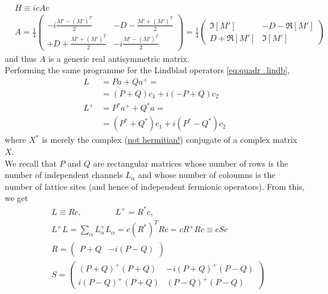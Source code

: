 \documentclass[a4paper,11pt]{article}
\theoremstyle{remark}
\newcommand{\ubar}[1]{\underline{#1}}
\begin{document}
    \begin{subequations}
    \label{eq:quadr_ham_majorana}
    \begin{align}
     & H \equiv icAc\\
     & A = \frac{1}{4}\left(
     \begin{array}{cc}
       -i\frac{M'-(M')^T}{2} & -D - \frac{M'+(M')^T}{2} \\
       + D + \frac{M'+(M')^T}{2} & -i \frac{M'-(M')^T}{2}
        \end{array}
        \right)
      =\frac{1}{4}\left( 
      \begin{array}{cc}
        \Im[M'] & -D-\Re[M']\\
        D+\Re[M'] & \Im[M']
        \end{array}
        \right)
    \end{align}
    \end{subequations}
    and thus $A$ is a generic real antisymmetric matrix.\\[0.3cm] Performing the same programme for the Lindblad operators \ref{eq:quadr_lindb},
    \begin{align*}
   L &= P a + Q a^+=\\
     &= (P+Q)c_1 +i(-P+Q)c_2\\
   L^+&= P^*a^++Q^*a=\\
     &= (P^*+Q^*)c_1+i(P^*-Q^*)c_2  
    \end{align*}  
   where $X^*$ is merely the complex (\ubar{not hermitian!}) conjugate of a complex matrix $X$. \\We recall that $P$ and $Q$ are rectangular matrices whose number of rows is the number of independent channels $L_{\alpha}$ and whose number of coloumns is the number of lattice sites (and hence of independent fermionic operators). From this, we get
  \begin{subequations}
  \label{eq:quadr_lindb_majorana}
  \begin{align}
      &L    \equiv Rc, \quad \quad \quad \quad  L^+  = R^*c,\\
      &L^+L = \sum_{\alpha} L^+_{\alpha}L^{ }_{\alpha} = c(R^*)^TRc = cR^+Rc \equiv cSc \\[0.3 cm]
      &R = \left(\begin{array}{cc} P+Q & -i(P-Q)\end{array}\right) \\
      &S =\left(\begin{array}{cc} (P+Q)^+(P+Q) & -i(P+Q)^+(P-Q)\\i(P-Q)^+(P+Q)&(P-Q)^+(P-Q) \end{array}\right)
  \end{align} 
  \end{subequations}
\end{document}
